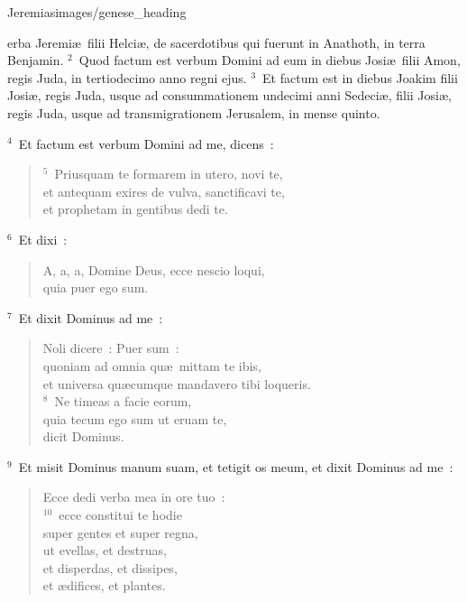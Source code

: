 {Jeremias}{images/genese_heading}


\bchapter
{}erba Jeremi\ae\ filii Helci\ae , de sacerdotibus qui fuerunt in Anathoth, in terra Benjamin.
${}^{2}$~Quod factum est verbum Domini ad eum in diebus Josi\ae\ filii Amon, regis Juda, in tertiodecimo anno regni ejus.
${}^{3}$~Et factum est in diebus Joakim filii Josi\ae , regis Juda, usque ad consummationem undecimi anni Sedeci\ae , filii Josi\ae , regis Juda, usque ad transmigrationem Jerusalem, in mense quinto.


${}^{4}$~Et factum est verbum Domini ad me, dicens~:
\begin{flushleft}\begin{verse}${}^{5}$~Priusquam te formarem in utero, novi te,\\ et antequam exires de vulva, sanctificavi te,\\ et prophetam in gentibus dedi te.\end{verse}\end{flushleft}


${}^{6}$~Et dixi~: \begin{flushleft}\begin{verse}A, a, a, Domine Deus, ecce nescio loqui,\\ quia puer ego sum.\end{verse}\end{flushleft}


${}^{7}$~Et dixit Dominus ad me~: \begin{flushleft}\begin{verse}Noli dicere~: Puer sum~:\\ quoniam ad omnia qu\ae\ mittam te ibis,\\ et universa qu\ae cumque mandavero tibi loqueris.\\
${}^{8}$~Ne timeas a facie eorum,\\ quia tecum ego sum ut eruam te,\\ dicit Dominus.\end{verse}\end{flushleft}


${}^{9}$~Et misit Dominus manum suam, et tetigit os meum, et dixit Dominus ad me~: \begin{flushleft}\begin{verse}Ecce dedi verba mea in ore tuo~:\\
${}^{10}$~ecce constitui te hodie\\ super gentes et super regna,\\ ut evellas, et destruas,\\ et disperdas, et dissipes,\\ et \ae difices, et plantes.\end{verse}\end{flushleft}


